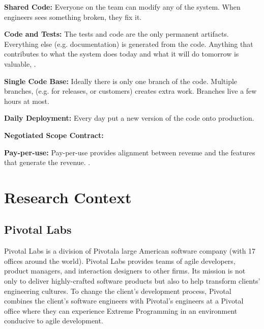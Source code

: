 \textbf{Shared Code:} Everyone on the team can modify any of the system. When engineers sees something broken, they fix it.


\textbf{Code and Tests:} The tests and code are the only permanent artifacts. Everything else (e.g. documentation) is generated from the code. Anything that contributes to what the system does today and what it will do tomorrow is valuable,  
\cite{BeckExtremeProgramming2004}.


\textbf{Single Code Base:} Ideally there is only one branch of the code. Multiple branches, (e.g. for releases, or customers) creates extra work. Branches live a few hours at most.


\textbf{Daily Deployment:} Every day put a new version of the code onto production. 


\textbf{Negotiated Scope Contract:}  




\textbf{Pay-per-use:} Pay-per-use provides alignment between revenue and the features that generate the revenue.   \cite{BeckExtremeProgramming2004}.




















\chapter{Research Context}
\label{ResearchContextChapter}


\section{Pivotal Labs}
Pivotal Labs is a division of Pivotal\textemdash a large American software company (with 17 offices around the world). Pivotal Labs provides teams of agile developers, product managers, and interaction designers to other firms. Its mission is not only to deliver highly-crafted software products but also to help transform clients' engineering cultures. To change the client's development process, Pivotal combines the client's software engineers with Pivotal's engineers at a Pivotal office where they can experience Extreme Programming \cite{BeckExtremeProgramming2004} in an environment conducive to agile development. 


